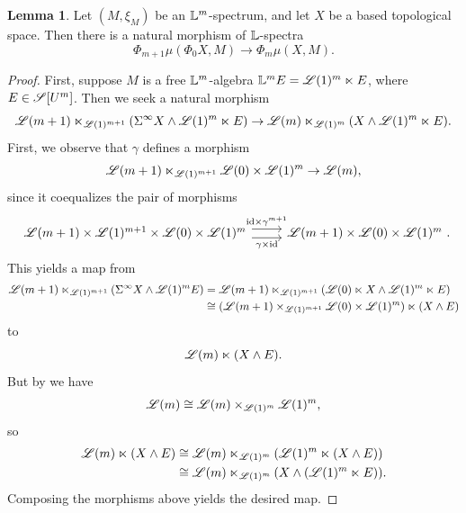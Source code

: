 \documentclass[openany, amssymb, psamsfonts]{amsart}
\theoremstyle{definition}
\newtheorem{lem}{Lemma}[section]
\numberwithin{equation}{section}
\begin{document}
\begin{lem} \label{lem:Smodule_morphism}
Let $(M, \xi_M)$ be an $\mathbb{L}^m$-spectrum, and let $X$ be a based topological space. Then there is a natural morphism of $\mathbb{L}$-spectra
\begin{equation*}
    \Phi_{m+1}\mu(\Phi_0 X, M) \to \Phi_m\mu(X, M).
\end{equation*}
\end{lem}
\begin{proof}
    First, suppose $M$ is a free $\mathbb{L}^m$-algebra $\mathbb{L}^m E = \mathscr{L}(1)^m \ltimes E$, where $E \in \mathscr{S}[U^m]$. Then we seek a natural morphism
    \begin{equation*}
        \mathscr{L}(m + 1) \ltimes_{\mathscr{L}(1)^{m + 1}}(\Sigma^\infty X \wedge \mathscr{L}(1)^m \ltimes E) \to \mathscr{L}(m) \ltimes_{\mathscr{L}(1)^m} (X \wedge \mathscr{L}(1)^m \ltimes E).
    \end{equation*} First, we observe that $\gamma$ defines a morphism
    \begin{equation*}
        \mathscr{L}(m + 1) \ltimes_{\mathscr{L}(1)^{m + 1}} \mathscr{L}(0) \times \mathscr{L}(1)^m \to \mathscr{L}(m),
    \end{equation*} since it coequalizes the pair of morphisms
    \begin{equation*}
        \begin{tikzcd}
            \scL(m + 1) \times \scL(1)^{m + 1} \times \scL(0) \times \scL(1)^m \ar[r, shift left = 0.35em, "\id \times \gamma^{m + 1}"] \ar[r, shift right = 0.35em, "\gamma \times \id"'] & \scL(m + 1) \times \scL(0) \times \scL(1)^m \period
        \end{tikzcd}
    \end{equation*} This yields a map from
    \begin{align*}
        \mathscr{L}(m + 1) \ltimes_{\mathscr{L}(1)^{m + 1}}(\Sigma^\infty X \wedge \mathscr{L}(1)^m E) &= \mathscr{L}(m + 1) \ltimes_{\mathscr{L}(1)^{m + 1}}(\mathscr{L}(0) \ltimes X \wedge \mathscr{L}(1)^m \ltimes E)\\
        &\cong (\mathscr{L}(m + 1) \times_{\mathscr{L}(1)^{m + 1}} \mathscr{L}(0) \times \mathscr{L}(1)^m) \ltimes (X \wedge E)
    \end{align*} to
    \begin{equation*}
        \mathscr{L}(m) \ltimes (X \wedge E).
    \end{equation*} But by  we have
    \begin{align*}
        \mathscr{L}(m) \cong \mathscr{L}(m) \times_{\mathscr{L}(1)^m} \mathscr{L}(1)^m,
    \end{align*} so
    \begin{align*}
        \mathscr{L}(m) \ltimes (X \wedge E) &\cong \mathscr{L}(m) \ltimes_{\mathscr{L}(1)^m} (\mathscr{L}(1)^m \ltimes (X \wedge E))\\
        &\cong \mathscr{L}(m) \ltimes_{\mathscr{L}(1)^m} (X \wedge (\mathscr{L}(1)^m \ltimes E)).
    \end{align*} Composing the morphisms above yields the desired map.


\end{proof}
\end{document}
